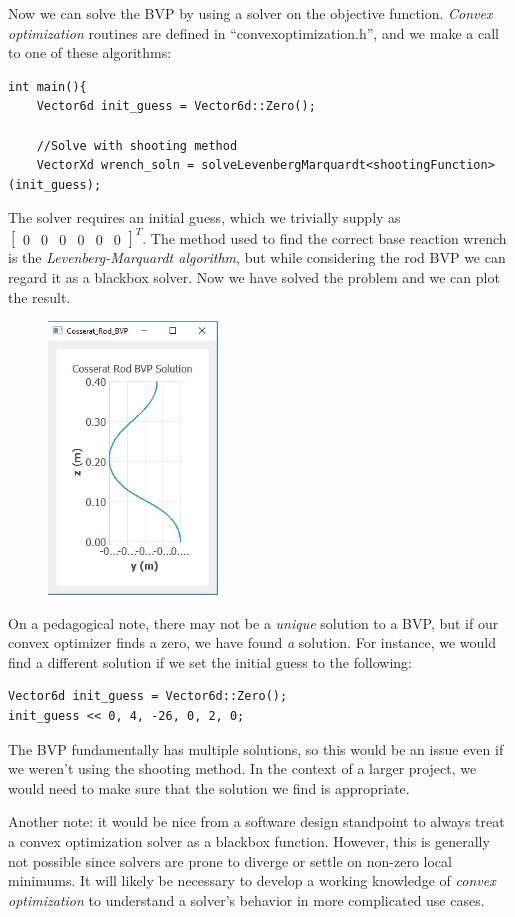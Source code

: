\documentclass[12pt]{article}
\begin{document}
Now we can solve the BVP by using a solver on the objective function. \emph{Convex optimization} routines are defined in ``convexoptimization.h'', and we make a call to one of these algorithms:
\begin{lstlisting}
int main(){
    Vector6d init_guess = Vector6d::Zero();

    //Solve with shooting method
    VectorXd wrench_soln = solveLevenbergMarquardt<shootingFunction>(init_guess);
\end{lstlisting}
The solver requires an initial guess, which we trivially supply as $\begin{bmatrix} 0 & 0 & 0 & 0 & 0 & 0\end{bmatrix}^T$. The method used to find the correct base reaction wrench is the \emph{Levenberg-Marquardt algorithm}, but while considering the rod BVP we can regard it as a blackbox solver. Now we have solved the problem and we can plot the result.
\begin{figure}[h]
	\centering
		\includegraphics[width=0.4\textwidth]{fig/SolutionPlot.jpg}
	\label{fig:SolutionPlot}
\end{figure}

On a pedagogical note, there may not be a \emph{unique} solution to a BVP, but if our convex optimizer finds a zero, we have found \emph{a} solution. For instance, we would find a different solution if we set the initial guess to the following:
\begin{lstlisting}
Vector6d init_guess = Vector6d::Zero();
init_guess << 0, 4, -26, 0, 2, 0;
\end{lstlisting}
The BVP fundamentally has multiple solutions, so this would be an issue even if we weren't using the shooting method. In the context of a larger project, we would need to make sure that the solution we find is appropriate.

Another note: it would be nice from a software design standpoint to always treat a convex optimization solver as a blackbox function. However, this is generally not possible since solvers are prone to diverge or settle on non-zero local minimums. It will likely be necessary to develop a working knowledge of \emph{convex optimization} to understand a solver's behavior in more complicated use cases.
\end{document}
